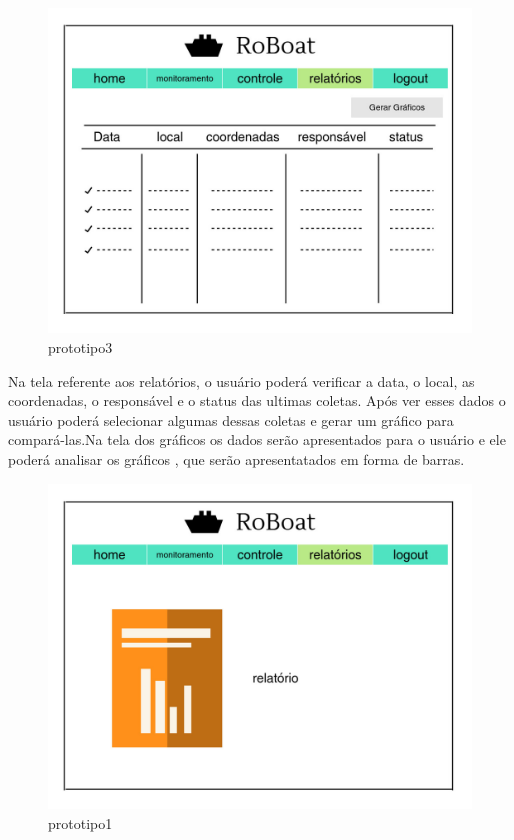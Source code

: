  \begin{figure} [!htp]
	\centering
	\includegraphics[scale=0.3]{figuras/prototipo-3}
	\caption{prototipo3}
	\label{Prototipo 3}
\end{figure}
\FloatBarrier

Na tela referente aos relatórios, o usuário poderá verificar a data, o local, as coordenadas, o responsável e o status das ultimas coletas. Após ver esses dados o usuário poderá selecionar algumas dessas coletas e gerar um gráfico para compará-las.Na tela dos gráficos os dados serão apresentados para o usuário e ele poderá analisar os gráficos , que serão apresentatados em forma de barras.

 \begin{figure} [!htp]
	\centering
	\includegraphics[scale=0.3]{figuras/prototipo-2}
	\caption{prototipo1}
	\label{Prototipo 2}
\end{figure}
\FloatBarrier

